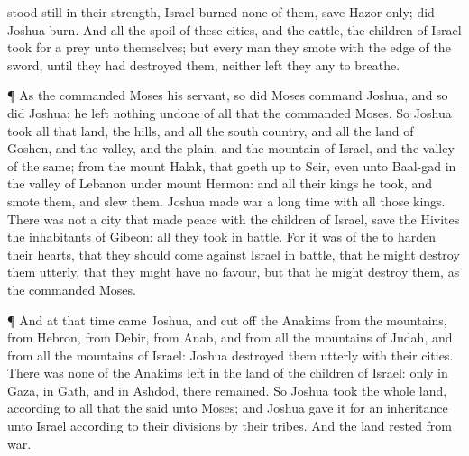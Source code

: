 {stood still in their
strength,
Israel
burned none of them,
save
Hazor only;
{} did
Joshua
burn.
And all the
spoil of these
cities, and the
cattle, the
children of
Israel took for a
prey unto themselves; but every
man they
smote with the
edge of the
sword, until they had
destroyed them, neither
left they any to
breathe.
\par }{\PP {}¶ As the
{}
commanded
Moses his
servant, so did
Moses
command
Joshua, and so
did
Joshua; he
left
nothing
undone of all that the
{}
commanded
Moses.
So
Joshua
took all that
land, the
hills, and all the south
country, and all the
land of
Goshen, and the
valley, and the
plain, and the
mountain of
Israel, and the
valley of the same;
 from the
mount
Halak, that goeth
up to
Seir, even unto
Baal-gad in the
valley of
Lebanon under
mount
Hermon: and all their
kings he
took, and
smote them, and
slew them.
Joshua
made
war a
long
time with all those
kings.
There was not a
city that made
peace with the
children of
Israel, save the
Hivites the
inhabitants of
Gibeon: all
{} they
took in
battle.
For it was of the
{} to
harden their
hearts, that they should come
against
Israel in
battle, that he might destroy them
utterly,
{} that they might have no
favour, but that he might
destroy them, as the
{}
commanded
Moses.
\par }{\PP {}¶ And at that
time
came
Joshua, and cut
off the
Anakims from the
mountains, from
Hebron, from
Debir, from
Anab, and from all the
mountains of
Judah, and from all the
mountains of
Israel:
Joshua destroyed them
utterly with their
cities.
There was none of the
Anakims
left in the
land of the
children of
Israel: only in
Gaza, in
Gath, and in
Ashdod, there
remained.
So
Joshua
took the whole
land, according to all that the
{}
said unto
Moses; and
Joshua
gave it for an
inheritance unto
Israel according to their
divisions by their
tribes. And the
land
rested from
war.

}
